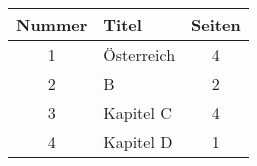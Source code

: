 \documentclass{article}
\begin{document}
\begin{tabular}{|c|l|c|}\hline
Nummer & Titel & Seiten \\\hline\hline
1 & ^^d6sterreich & 4 \\
2 & B & 2 \\
3 & Kapitel C & 4 \\
4 & Kapitel D & 1 \\
\hline
\end{tabular}
\end{document}
